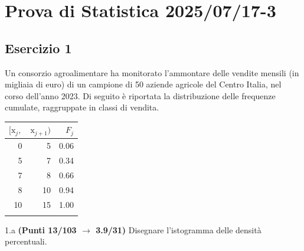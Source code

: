 \documentclass[
  11pt,
]{book}
\theoremstyle{mytheoremstyle}
\theoremstyle{mydefstyle}
\begin{document}
\section{Prova di Statistica 2025/07/17-3}\label{prova-di-statistica-20250717-3}

\subsection{Esercizio 1}\label{esercizio-1-51}

Un consorzio agroalimentare ha monitorato l'ammontare delle vendite mensili (in migliaia di euro) di un campione di 50 aziende agricole del Centro Italia, nel corso dell'anno 2023.
Di seguito è riportata la distribuzione delle frequenze cumulate, raggruppate in classi di vendita.

\begin{table}[H]
\centering
\begin{tabular}{rrr}
\toprule
$[\text{x}_j,$ & $\text{x}_{j+1})$ & $F_j$\\
\midrule
0 & 5 & 0.06\\
5 & 7 & 0.34\\
7 & 8 & 0.66\\
8 & 10 & 0.94\\
10 & 15 & 1.00\\
 &  & \\
\bottomrule
\end{tabular}
\end{table}

1.a \textbf{(Punti 13/103 \(\rightarrow\) 3.9/31)} Disegnare l'istogramma delle densità percentuali.
\end{document}

